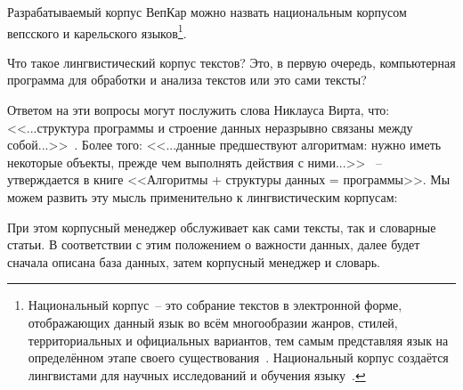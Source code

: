 Разрабатываемый корпус ВепКар можно назвать национальным корпусом 
вепсского и карельского языков\footnote{ Национальный корпус~-- это собрание текстов 
в электронной форме, 
отображающих данный язык во всём многообразии жанров, стилей, территориальных и официальных вариантов, 
тем самым представляя язык на определённом этапе своего существования~\cite[с.~418]{Kibrik2019}. 
Национальный корпус создаётся лингвистами для научных исследований и обучения языку~\cite[с.~419]{Kibrik2019}.
}.

Что такое лингвистический корпус текстов? Это, в первую очередь, компьютерная программа для обработки и анализа текстов или это сами тексты? 

Ответом на эти вопросы могут послужить слова Никлауса Вирта, что: 
<<...структура программы и строение данных неразрывно связаны между собой...>>~\cite[с.~9]{Wirth1989AlgorithmsAndDataStructure}. 
Более того:   
<<...данные предшествуют алгоритмам: нужно иметь некоторые объекты, 
прежде чем выполнять действия с ними...>>~\cite[с.~8]{Wirth1985Algorithms+} 
-- утверждается в книге <<Алгоритмы + структуры данных = программы>>.
Мы можем развить эту мысль применительно к лингвистическим корпусам:
        

\noindent
При этом корпусный менеджер обслуживает как сами тексты, так и словарные статьи. 
В соответствии с этим положением о важности данных, далее будет  
сначала описана база данных, затем корпусный менеджер и словарь.

 

 











